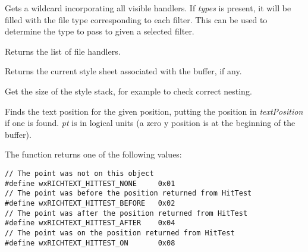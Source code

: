 \label{wxrichtextbuffergetextwildcard}


Gets a wildcard incorporating all visible handlers. If {\it types} is present,
it will be filled with the file type corresponding to each filter. This can be
used to determine the type to pass to  given a selected filter.

\label{wxrichtextbuffergethandlers}


Returns the list of file handlers.

\label{wxrichtextbuffergetstylesheet}


Returns the current style sheet associated with the buffer, if any.

\label{wxrichtextbuffergetstylestacksize}


Get the size of the style stack, for example to check correct nesting.

\label{wxrichtextbufferhittest}


Finds the text position for the given position, putting the position in {\it textPosition} if
one is found. {\it pt} is in logical units (a zero y position is
at the beginning of the buffer).

The function returns one of the following values:

{\small
\begin{verbatim}
// The point was not on this object
#define wxRICHTEXT_HITTEST_NONE     0x01
// The point was before the position returned from HitTest
#define wxRICHTEXT_HITTEST_BEFORE   0x02
// The point was after the position returned from HitTest
#define wxRICHTEXT_HITTEST_AFTER    0x04
// The point was on the position returned from HitTest
#define wxRICHTEXT_HITTEST_ON       0x08
\end{verbatim}
}

